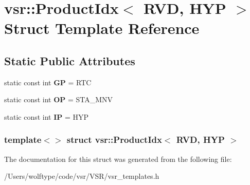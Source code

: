 \hypertarget{structvsr_1_1_product_idx_3_01_r_v_d_00_01_h_y_p_01_4}{\section{vsr\-:\-:Product\-Idx$<$ R\-V\-D, H\-Y\-P $>$ Struct Template Reference}
\label{structvsr_1_1_product_idx_3_01_r_v_d_00_01_h_y_p_01_4}
}
\subsection*{Static Public Attributes}
\begin{DoxyCompactItemize}
\item 
\hypertarget{structvsr_1_1_product_idx_3_01_r_v_d_00_01_h_y_p_01_4_a6f550fc789a2540a39d5adbe30b7afcb}{static const int {\bfseries G\-P} = R\-T\-C}\label{structvsr_1_1_product_idx_3_01_r_v_d_00_01_h_y_p_01_4_a6f550fc789a2540a39d5adbe30b7afcb}

\item 
\hypertarget{structvsr_1_1_product_idx_3_01_r_v_d_00_01_h_y_p_01_4_a853d73fd3952b4b0a539fee663b0ea0a}{static const int {\bfseries O\-P} = S\-T\-A\-\_\-\-M\-N\-V}\label{structvsr_1_1_product_idx_3_01_r_v_d_00_01_h_y_p_01_4_a853d73fd3952b4b0a539fee663b0ea0a}

\item 
\hypertarget{structvsr_1_1_product_idx_3_01_r_v_d_00_01_h_y_p_01_4_a29bed07a64eb45bd719adada1f1bd727}{static const int {\bfseries I\-P} = H\-Y\-P}\label{structvsr_1_1_product_idx_3_01_r_v_d_00_01_h_y_p_01_4_a29bed07a64eb45bd719adada1f1bd727}

\end{DoxyCompactItemize}
\subsubsection*{template$<$$>$ struct vsr\-::\-Product\-Idx$<$ R\-V\-D, H\-Y\-P $>$}



The documentation for this struct was generated from the following file\-:\begin{DoxyCompactItemize}
\item 
/\-Users/wolftype/code/vsr/\-V\-S\-R/vsr\-\_\-templates.\-h\end{DoxyCompactItemize}

